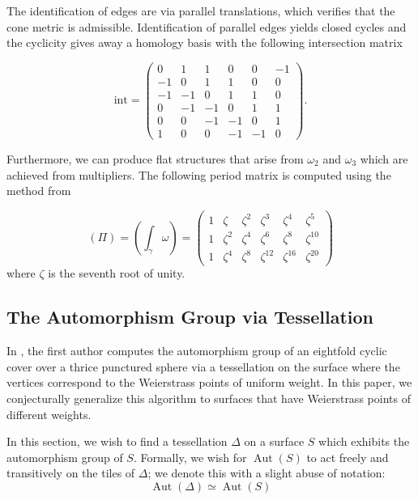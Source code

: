 \documentclass[12pt,reqno]{amsart}
\DeclareMathOperator{\Aut}{Aut}
\theoremstyle{definition}
\theoremstyle{remark}
\begin{document}
The identification of edges are via parallel translations, which verifies that the cone metric is admissible. Identification of parallel edges yields closed cycles and the cyclicity gives away a homology basis with the following intersection matrix

$$\textrm{int} = \begin{pmatrix}
 0 & 1 & 1 & 0 & 0 & -1 \\
 -1 & 0 & 1 & 1 & 0 & 0 \\
 -1 & -1 & 0 & 1 & 1 & 0 \\
 0 & -1 & -1 & 0 & 1 & 1 \\
 0 & 0 & -1 & -1 & 0 & 1 \\
 1 & 0 & 0 & -1 & -1 & 0 
\end{pmatrix}.$$

Furthermore, we can produce flat structures that arise from $\omega_2$ and $\omega_3$ which are achieved from multipliers. The following period matrix is computed using the method from \cite{kw}

 $$(\Pi) = (\int_{\gamma} \omega) = \begin{pmatrix}
  1 & \zeta  & \zeta^2 & \zeta^3 & \zeta^4 & \zeta^5 \\
 1 & \zeta^2 & \zeta^4 & \zeta^6 & \zeta^8 & \zeta^{10} \\
 1 & \zeta^4 & \zeta^8 & \zeta^{12} & \zeta^{16} & \zeta^{20} 
 \end{pmatrix}$$ where $\zeta$ is the seventh root of unity.


\subsection{The Automorphism Group via Tessellation}

\label{sec:flagflag}

In \cite{dami}, the first author computes the automorphism group of an eightfold cyclic cover over a thrice punctured sphere via a tessellation on the surface where the vertices correspond to the Weierstrass points of uniform weight. In this paper, we conjecturally generalize this algorithm to surfaces that have Weierstrass points of different weights. %

In this section, we wish to find a tessellation $\Delta$ on a surface $S$ which exhibits the automorphism group of $S$. Formally, we wish for $\Aut(S)$ to act freely and transitively on the tiles of $\Delta$; we denote this with a slight abuse of notation: $$\Aut(\Delta) \simeq \Aut(S)$$
\end{document}
